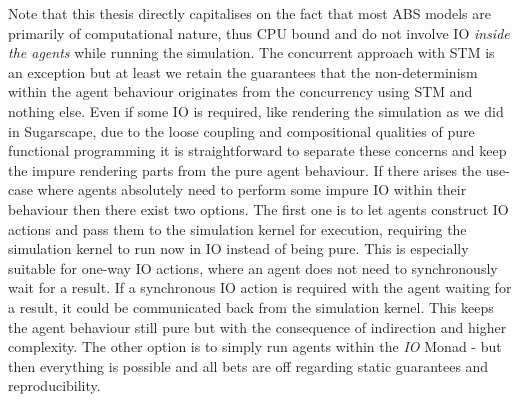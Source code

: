 Note that this thesis directly capitalises on the fact that most ABS models are primarily of computational nature, thus CPU bound and do not involve IO \textit{inside the agents} while running the simulation. The concurrent approach with STM is an exception but at least we retain the guarantees that the non-determinism within the agent behaviour originates from the concurrency using STM and nothing else. Even if some IO is required, like rendering the simulation as we did in Sugarscape, due to the loose coupling and compositional qualities of pure functional programming it is straightforward to separate these concerns and keep the impure rendering parts from the pure agent behaviour. If there arises the use-case where agents absolutely need to perform some impure IO within their behaviour then there exist two options. The first one is to let agents construct IO actions and pass them to the simulation kernel for execution, requiring the simulation kernel to run now in IO instead of being pure. This is especially suitable for one-way IO actions, where an agent does not need to synchronously wait for a result. If a synchronous IO action is required with the agent waiting for a result, it could be communicated back from the simulation kernel. This keeps the agent behaviour still pure but with the consequence of indirection and higher complexity. The other option is to simply run agents within the \textit{IO} Monad - but then everything is possible and all bets are off regarding static guarantees and reproducibility.

%
%
%	
%	

